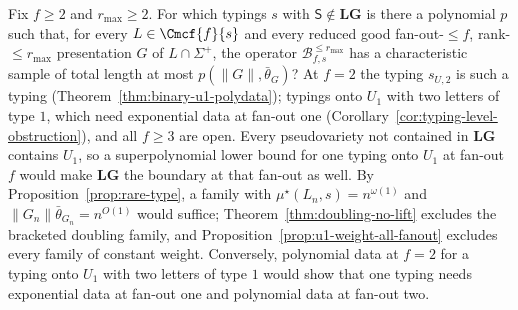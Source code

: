 \begin{openproblem}
\label{op:fanout-two}
Fix $f\ge2$ and $r_{\max}\ge2$.  For which typings $s$ with
$\mathsf S\notin\mathbf{LG}$ is there a polynomial $p$ such that, for every
$L\in\Cmcf{f}{s}$ and every reduced good fan-out-$\le f$, rank-$\le r_{\max}$
presentation $G$ of $L\cap\Sigma^+$, the operator
$\mathcal B^{\le r_{\max}}_{f,s}$ has a characteristic sample of total length
at most $p(\|G\|,\bar\theta_G)$?  At $f=2$ the typing $s_{U,2}$ is such a typing
(Theorem~\ref{thm:binary-u1-polydata}); typings onto $U_1$ with two letters of
type $1$, which need exponential data at fan-out one
(Corollary~\ref{cor:typing-level-obstruction}), and all $f\ge3$ are open.  Every
pseudovariety not contained in $\mathbf{LG}$ contains $U_1$, so a
superpolynomial lower bound for one typing onto $U_1$ at fan-out $f$ would make
$\mathbf{LG}$ the boundary at that fan-out as well.  By
Proposition~\ref{prop:rare-type}, a family with $\mu^\star(L_n,s)=n^{\omega(1)}$
and $\|G_n\|\bar\theta_{G_n}=n^{O(1)}$ would suffice;
Theorem~\ref{thm:doubling-no-lift} excludes the bracketed doubling family, and
Proposition~\ref{prop:u1-weight-all-fanout} excludes every family of constant
weight.  Conversely, polynomial data at $f=2$ for a typing onto $U_1$ with two
letters of type $1$ would show that one typing needs exponential data at fan-out
one and polynomial data at fan-out two.
\end{openproblem}

